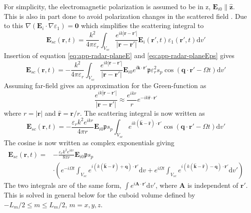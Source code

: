 \documentclass[11pt,twoside]{eitExjobb}
\begin{document}
	For simplicity, the electromagnetic polarization is assumed to be in z, $\bm{E}_{i0} \parallel \bm{\hat{z}}$. This is also in part done to avoid polarization changes in the scattered field \cite{Korpel1988}. Due to this $\nabla(\bm{E}_i \cdot \nabla \varepsilon_1) = \bm{0}$ which simplifies the scattering integral to
	\begin{equation*}
		\bm{E}_{sc}(\bm{r},t) = \frac{k^2}{4\pi\varepsilon_r} \int_{V_{sc}} \frac{e^{ik |\bm{r}-\bm{r'}| }}{ |\bm{r}-\bm{r'}|} \bm{E}_i (\bm{r'},t) \varepsilon_1 (\bm{r'},t) \mathrm{d}v'
	\end{equation*}
	Insertion of equation \eqref{eq:app-radar-planeE} and \eqref{eq:app-radar-planeEps} gives
	\begin{equation*}
		\bm{E}_{sc}(\bm{r},t) = -\frac{k^2}{4\pi\varepsilon_r} \int_{V_{sc}} \frac{e^{ik |\bm{r}-\bm{r'}| }}{ |\bm{r}-\bm{r'}|} \bm{E}_{i0} e^{i\bm{k} \cdot \bm{r}'} \mathfrak{p} \varepsilon_r^2 s_p \cos(\bm{q} \cdot \bm{r}' - \Omega t) \mathrm{d}v'
	\end{equation*}
	Assuming far-field gives an approximation for the Green-function as \cite{Kristensson2008}
	\begin{equation*}
		\frac{e^{ik |\bm{r}-\bm{r'}| }}{ |\bm{r}-\bm{r'}|} \approx \frac{e^{ikr}}{r} e^{-ik \bm{\hat{r}} \cdot \bm{r}'}
	\end{equation*}
	where $r = |\bm{r}|$ and $\bm{\hat{r}} = \bm{r}/r$. The scattering integral is now written as
	\begin{equation*}
		\bm{E}_{sc}(\bm{r},t) = -\frac{\varepsilon_rk^2 e^{ikr}}{4\pi r} \bm{E}_{i0} \mathfrak{p} s_p \int_{V_{sc}} e^{ik ( \bm{\hat{k}} - \bm{\hat{r}} ) \cdot \bm{r}'} \cos(\bm{q} \cdot \bm{r}' - \Omega t) \mathrm{d}v'
	\end{equation*}
	The cosine is now written as complex exponentials giving
	\begin{equation*}
	\begin{split}
			\bm{E}_{sc}(\bm{r},t) =& -\frac{\varepsilon_rk^2 e^{ikr}}{8\pi r} \bm{E}_{i0} \mathfrak{p} s_p \\
			&\cdot \left( e^{-i\Omega t} \int_{V_{sc}} e^{i( k(\bm{\hat{k}} - \bm{\hat{r}}) + \bm{q} ) \cdot \bm{r}'} \mathrm{d}v + e^{i\Omega t} \int_{V_{sc}} e^{i( k(\bm{\hat{k}} - \bm{\hat{r}}) - \bm{q} ) \cdot \bm{r}'} \mathrm{d}v' \right)
	\end{split}
	\end{equation*}
	The two integrals are of the same form, $\int e^{i\bm{A} \cdot \bm{r}'} \mathrm{d}v'$, where $\bm{A}$ is independent of $\bm{r}'$. This is solved in general below for the cuboid volume defined by $-L_m/2 \leq m \leq L_m/2$, $m = x,y,z$.
\end{document}
